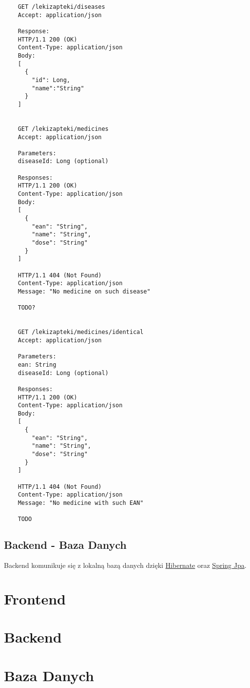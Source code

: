 \documentclass{article}
\begin{document}
  \begin{lstlisting}
    GET /lekizapteki/diseases
    Accept: application/json

    Response:
    HTTP/1.1 200 (OK)
    Content-Type: application/json
    Body:
    [
      {
        "id": Long,
        "name":"String"
      }
    ]


    GET /lekizapteki/medicines
    Accept: application/json

    Parameters:
    diseaseId: Long (optional)

    Responses:
    HTTP/1.1 200 (OK)
    Content-Type: application/json
    Body:
    [
      {
        "ean": "String",
        "name": "String",
        "dose": "String"
      }
    ]

    HTTP/1.1 404 (Not Found)
    Content-Type: application/json
    Message: "No medicine on such disease"

    TODO?


    GET /lekizapteki/medicines/identical
    Accept: application/json

    Parameters:
    ean: String
    diseaseId: Long (optional)

    Responses:
    HTTP/1.1 200 (OK)
    Content-Type: application/json
    Body:
    [
      {
        "ean": "String",
        "name": "String",
        "dose": "String"
      }
    ]

    HTTP/1.1 404 (Not Found)
    Content-Type: application/json
    Message: "No medicine with such EAN"

    TODO

  \end{lstlisting}

  \subsection{Backend - Baza Danych}
  Backend komunikuje się z lokalną bazą danych dzięki
  \href{https://hibernate.org}{Hibernate} oraz
  \href{https://spring.io/projects/spring-data-jpa} {Spring Jpa}.

  \section{Frontend}

  \section{Backend}

  \section{Baza Danych}
\end{document}
